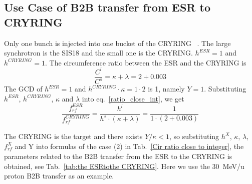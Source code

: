 \subsection{Use Case of B2B transfer from ESR to CRYRING}
Only one bunch is injected into one bucket of the CRYRING ~\cite{herfurth_low_2013, lestinsky_cryring_2015}. The large synchrotron is the SIS18 and the small one is the CRYRING. $h^{\mathit{ESR}}=1$ and $h^{\mathit{CRYRING}}=1$. The circumference ratio between the ESR and the CRYRING is
\begin{equation}
\frac{C^l}{C^s}=\kappa + \lambda =2+0.003
\end{equation}
The GCD of $h^{\mathit{ESR}}=1$ and $h^{\mathit{CRYRING}} \cdot \kappa=1\cdot 2$ is 1, namely $Y=1$. Substituting $h^{\mathit{ESR}}$, $h^{\mathit{CRYRING}}$, $\kappa$ and $\lambda$ into eq.~\ref{ratio_close_int}, we get
\begin{equation}
\frac {f_{\mathit{rf}}^{\mathit{ESR}}}{f_{\mathit{rf}}^{\mathit{CRYRING}}}= \frac{h^l}{h^s \cdot (\kappa+ \lambda)}=\frac {1}{1 \cdot(2+0.003)}
\end{equation}

The CRYRING is the target and there exists $Y/\kappa<1$, so substituting $h^X$, $\kappa$, $\lambda$, $f_{\mathit{rf}}^{X}$ and Y into formulas of the case (2) in Tab.~\ref{Cir ratio close to integer}, the parameters related to the B2B transfer from the ESR to the CRYRING is obtained, see Tab.~\ref{tab:the ESRtothe CRYRING}. Here we use the \SI{30}{MeV/\atomicmassunit} proton B2B transfer as an example. 

